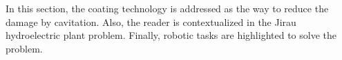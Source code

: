 


In this section, the coating technology is addressed as the way to
reduce the damage by cavitation. Also, the reader is contextualized in
the Jirau hydroelectric plant problem. Finally,  robotic tasks are highlighted to
solve the problem.

